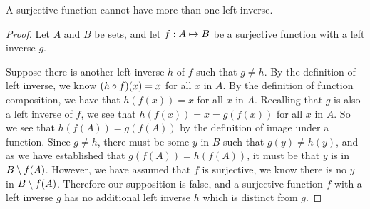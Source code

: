 \documentclass[main.tex]{subfiles}
\begin{document}
\begin{thm}
	A surjective function cannot have more than one left inverse.
\end{thm}
\begin{proof}
	Let \(A\) and \(B\) be sets, and let \({f}: {A} \mapsto{} {B}\) be a
	surjective function with a left inverse \(g\).

	Suppose there is another left inverse \(h\) of \(f\) such that
	\(g \neq h\). By the definition of left inverse, we know
	\(({h} \circ{} {f})({x}) = x\) for all \(x\) in \(A\). By the definition
	of function composition, we have that \(h(f(x)) = x\) for all \(x\) in
	\(A\). Recalling that \(g\) is also a left inverse of \(f\), we see that
	\(h(f(x)) = x = g(f(x))\) for all \(x\) in \(A\). So we see that
	\(h(f(A)) = g(f(A))\) by the definition of image under a function. Since
	\(g \neq h\), there must be some \(y\) in \(B\) such that
	\(g(y) \neq h(y)\), and as we have established that
	\(g(f(A)) = h(f(A))\), it must be that \(y\) is in \(B \setminus f(A)\).
	However, we have assumed that \(f\) is surjective, we know there is no
	\(y\) in \(B \setminus f(A)\). Therefore our supposition is false, and a
	surjective function \(f\) with a left inverse \(g\) has no additional
	left inverse \(h\) which is distinct from \(g\).
\end{proof}
\end{document}
